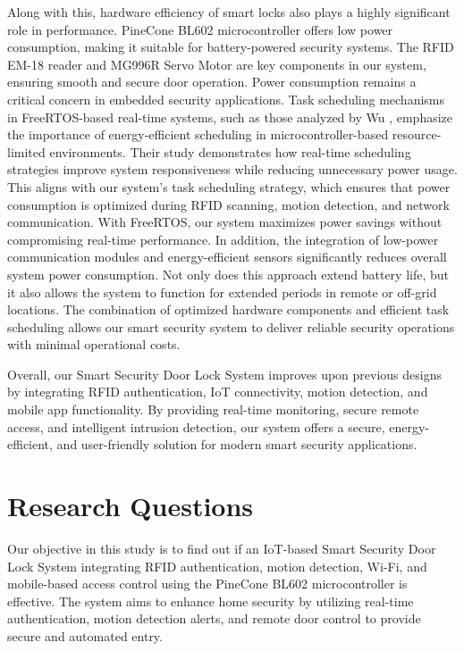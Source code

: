 \documentclass[a4paper]{scrartcl}
\begin{document}
Along with this, hardware efficiency of smart locks also plays a highly significant role in performance. PineCone BL602 microcontroller \cite{PINE64} offers low power consumption, making it suitable for battery-powered security systems. The RFID EM-18 reader \cite{RFIDReaderEM18} and MG996R Servo Motor \cite{MG996RServoMotor} are key components in our system, ensuring smooth and secure door operation. Power consumption remains a critical concern in embedded security applications. Task scheduling mechanisms in FreeRTOS-based real-time systems, such as those analyzed by Wu \cite{Wu2024}, emphasize the importance of energy-efficient scheduling in microcontroller-based resource-limited environments. Their study demonstrates how real-time scheduling strategies improve system responsiveness while reducing unnecessary power usage. This aligns with our system’s task scheduling strategy, which ensures that power consumption is optimized during RFID scanning, motion detection, and network communication. With FreeRTOS, our system maximizes power savings without compromising real-time performance. In addition, the integration of low-power communication modules and energy-efficient sensors significantly reduces overall system power consumption. Not only does this approach extend battery life, but it also allows the system to function for extended periods in remote or off-grid locations. The combination of optimized hardware components and efficient task scheduling allows our smart security system to deliver reliable security operations with minimal operational costs.

Overall, our Smart Security Door Lock System improves upon previous designs by integrating RFID authentication, IoT connectivity, motion detection, and mobile app functionality. By providing real-time monitoring, secure remote access, and intelligent intrusion detection, our system offers a secure, energy-efficient, and user-friendly solution for modern smart security applications.





\section{ Research Questions}
\label{sec:questions} 

Our objective in this study is to find out if an IoT-based Smart Security Door Lock System integrating RFID authentication, motion detection, Wi-Fi, and mobile-based access control using the PineCone BL602 microcontroller is effective. The system aims to enhance home security by utilizing real-time authentication, motion detection alerts, and remote door control to provide secure and automated entry.
\end{document}
